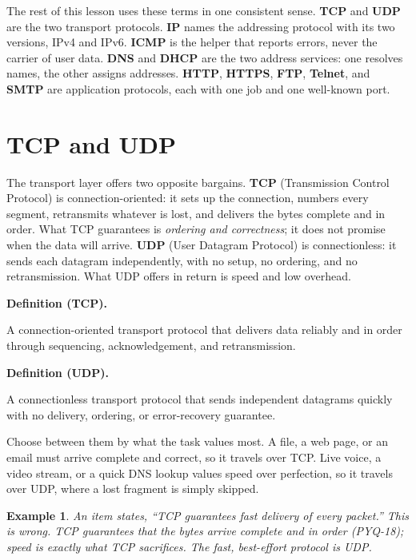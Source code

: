 \documentclass[11pt]{article}
\newtheorem{example}{Example}[section]
\newenvironment{definitionbox}[1]{%
  \par\noindent\textbf{Definition (#1).}\ \itshape
}{\par\vspace{0.3em}}
\begin{document}
The rest of this lesson uses these terms in one consistent sense. \textbf{TCP}
and \textbf{UDP} are the two transport protocols. \textbf{IP} names the
addressing protocol with its two versions, IPv4 and IPv6. \textbf{ICMP} is the
helper that reports errors, never the carrier of user data. \textbf{DNS} and
\textbf{DHCP} are the two address services: one resolves names, the other
assigns addresses. \textbf{HTTP}, \textbf{HTTPS}, \textbf{FTP},
\textbf{Telnet}, and \textbf{SMTP} are application protocols, each with one
job and one well-known port.

\section{TCP and UDP}
The transport layer offers two opposite bargains. \textbf{TCP} (Transmission
Control Protocol) is connection-oriented: it sets up the connection, numbers
every segment, retransmits whatever is lost, and delivers the bytes complete
and in order. What TCP guarantees is \emph{ordering and correctness}; it does
not promise when the data will arrive. \textbf{UDP} (User Datagram Protocol)
is connectionless: it sends each datagram independently, with no setup, no
ordering, and no retransmission. What UDP offers in return is speed and low
overhead.

\begin{definitionbox}{TCP}
A connection-oriented transport protocol that delivers data reliably and in
order through sequencing, acknowledgement, and retransmission.
\end{definitionbox}

\begin{definitionbox}{UDP}
A connectionless transport protocol that sends independent datagrams quickly
with no delivery, ordering, or error-recovery guarantee.
\end{definitionbox}

Choose between them by what the task values most. A file, a web page, or an
email must arrive complete and correct, so it travels over TCP. Live voice, a
video stream, or a quick DNS lookup values speed over perfection, so it
travels over UDP, where a lost fragment is simply skipped.

\begin{example}
An item states, ``TCP guarantees fast delivery of every packet.'' This is
wrong. TCP guarantees that the bytes arrive complete and in order (PYQ-18);
speed is exactly what TCP sacrifices. The fast, best-effort protocol is UDP.
\end{example}
\end{document}
